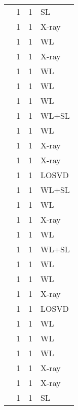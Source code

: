 \begin{center}
\begin{longtable}{|l|l|l|l|}
{\footnotesize \citet{WI04.1}} & 1 & 1 & {\small SL} \\
{\footnotesize \citet{WA05.1}} & 1 & 1 & {\small X-ray} \\
{\footnotesize \citet{SC10.1}} & 1 & 1 & {\small WL} \\
{\footnotesize \citet{PO04.1}} & 1 & 1 & {\small X-ray} \\
{\footnotesize \citet{PA07.1}} & 1 & 1 & {\small WL} \\
{\footnotesize \citet{OK14.1}} & 1 & 1 & {\small WL} \\
{\footnotesize \citet{OK11.1}} & 1 & 1 & {\small WL} \\
{\footnotesize \citet{OG13.1}} & 1 & 1 & {\small WL+SL} \\
{\footnotesize \citet{ME07.1}} & 1 & 1 & {\small WL} \\
{\footnotesize \citet{MC99.1}} & 1 & 1 & {\small X-ray} \\
{\footnotesize \citet{MA07.1}} & 1 & 1 & {\small X-ray} \\
{\footnotesize \citet{LO03.1}} & 1 & 1 & {\small LOSVD} \\
{\footnotesize \citet{LI07.1}} & 1 & 1 & {\small WL+SL} \\
{\footnotesize \citet{LE11.1}} & 1 & 1 & {\small WL} \\
{\footnotesize \citet{LE03.1}} & 1 & 1 & {\small X-ray} \\
{\footnotesize \citet{KU07.1}} & 1 & 1 & {\small WL} \\
{\footnotesize \citet{KN03.1}} & 1 & 1 & {\small WL+SL} \\
{\footnotesize \citet{KL05.1}} & 1 & 1 & {\small WL} \\
{\footnotesize \citet{KI02.1}} & 1 & 1 & {\small WL} \\
{\footnotesize \citet{KH06.1}} & 1 & 1 & {\small X-ray} \\
{\footnotesize \citet{KE02.2}} & 1 & 1 & {\small LOSVD} \\
{\footnotesize \citet{IS10.1}} & 1 & 1 & {\small WL} \\
{\footnotesize \citet{GR13.1}} & 1 & 1 & {\small WL} \\
{\footnotesize \citet{GA09.1}} & 1 & 1 & {\small WL} \\
{\footnotesize \citet{GA08.1}} & 1 & 1 & {\small X-ray} \\
{\footnotesize \citet{GA07.1}} & 1 & 1 & {\small X-ray} \\
{\footnotesize \citet{GA02.2}} & 1 & 1 & {\small SL} \\

\end{longtable}
\end{center}
